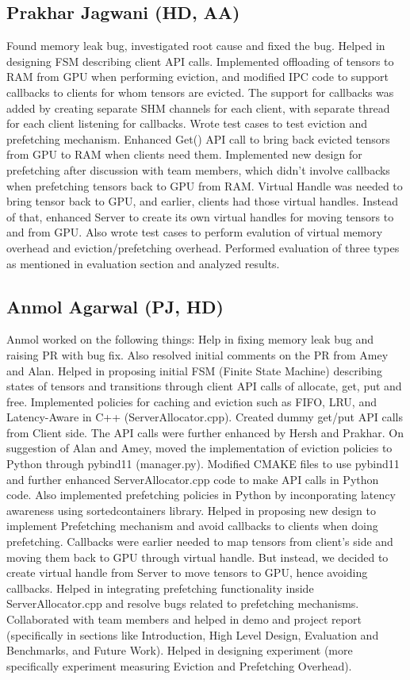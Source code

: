 \documentclass{article}
\begin{document}
\subsection{Prakhar Jagwani (HD, AA)}
Found memory leak bug, investigated root cause and fixed the bug.
Helped in designing FSM describing client API calls. 
Implemented offloading of tensors to RAM from GPU when performing eviction, and modified
IPC code to support callbacks to clients for whom tensors are evicted. The support for callbacks
was added by creating separate SHM channels for each client, with separate thread for each client listening for callbacks.
Wrote test cases to test eviction and prefetching mechanism.
Enhanced Get() API call to bring back evicted tensors from GPU to RAM when clients need them.
Implemented new design for prefetching after discussion with team members, which didn't
involve callbacks when prefetching tensors back to GPU from RAM. Virtual Handle was needed to
bring tensor back to GPU, and earlier, clients had those virtual handles. Instead of that, enhanced
Server to create its own virtual handles for moving tensors to and from GPU.
Also wrote test cases to perform evalution of virtual memory overhead and eviction/prefetching overhead.
Performed evaluation of three types as mentioned in evaluation section and analyzed results.

\subsection{Anmol Agarwal (PJ, HD)}
Anmol worked on the following things:
Help in fixing memory leak bug and raising PR with bug fix. Also resolved initial comments on the PR from Amey and Alan.
Helped in proposing initial FSM (Finite State Machine) describing states of tensors and transitions through client API calls
of allocate, get, put and free.
Implemented policies for caching and eviction such as FIFO, LRU, and Latency-Aware in C++ (ServerAllocator.cpp). 
Created dummy get/put API calls from Client side. The API calls were further enhanced by Hersh and Prakhar.
On suggestion of Alan and Amey, moved the implementation of eviction policies to Python through pybind11 (manager.py).
Modified CMAKE files to use pybind11 and further enhanced ServerAllocator.cpp code to make API calls in Python code.
Also implemented prefetching policies in Python by inconporating latency awareness using sortedcontainers library.
Helped in proposing new design to implement Prefetching mechanism and avoid callbacks to clients when doing prefetching.
Callbacks were earlier needed to map tensors from client's side and moving them back to GPU through virtual handle. But instead,
we decided to create virtual handle from Server to move tensors to GPU, hence avoiding callbacks.
Helped in integrating prefetching functionality inside ServerAllocator.cpp and resolve bugs related to prefetching mechanisms.
Collaborated with team members and helped in demo and project report (specifically in sections like Introduction, High Level Design,
Evaluation and Benchmarks, and Future Work).
Helped in designing experiment (more specifically experiment measuring Eviction and Prefetching Overhead).
\end{document}
